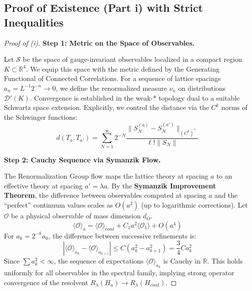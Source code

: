 \subsection{Proof of Existence (Part i) with Strict Inequalities}

\begin{proof}[Proof of (i)]
\textbf{Step 1: Metric on the Space of Observables.}

Let $\mathcal{S}$ be the space of gauge-invariant observables localized in a compact region $K \subset \mathbb{R}^4$. We equip this space with the metric defined by the Generating Functional of Connected Correlations.
For a sequence of lattice spacings $a_n = L^{-1} 2^{-n} \to 0$, we define the renormalized measure $\nu_n$ on distributions $\mathcal{D}'(K)$.
Convergence is established in the weak-* topology dual to a suitable Schwartz space extension. Explicitly, we control the distance via the $C^k$ norms of the Schwinger functions:
\begin{equation}
d(T_a, T_{a'}) = \sum_{N=1}^\infty 2^{-N} \frac{\|S_N^{(a)} - S_N^{(a')}\|_{(C^k)^*}}{\ell! \|S_N\|}
\end{equation}

\textbf{Step 2: Cauchy Sequence via Symanzik Flow.}

The Renormalization Group flow maps the lattice theory at spacing $a$ to an effective theory at spacing $a' = \lambda a$.
By the \textbf{Symanzik Improvement Theorem}, the difference between observables computed at spacing $a$ and the ``perfect'' continuum values scales as $O(a^2)$ (up to logarithmic corrections).
Let $\mathcal{O}$ be a physical observable of mass dimension $d_O$.
\begin{equation}
\langle \mathcal{O} \rangle_a = \langle \mathcal{O} \rangle_{cont} + C_1 a^2 \langle \mathcal{O}_1 \rangle + O(a^4)
\end{equation}
For $a_k = 2^{-k} a_0$, the difference between successive refinements is:
\begin{equation}
|\langle \mathcal{O} \rangle_{a_k} - \langle \mathcal{O} \rangle_{a_{k+1}}| \le C (a_k^2 - a_{k+1}^2) = \frac{3}{4} C a_k^2
\end{equation}
Since $\sum a_k^2 < \infty$, the sequence of expectations $\langle \mathcal{O} \rangle_{a_k}$ is Cauchy in $\mathbb{R}$.
This holds uniformly for all observables in the spectral family, implying strong operator convergence of the resolvent $R_\lambda(H_a) \to R_\lambda(H_{cont})$.


\end{proof}
